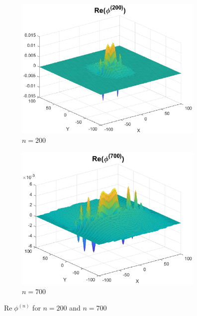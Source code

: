 \documentclass[smallextended]{svjour3}
\theoremstyle{remark}
\renewcommand\Re{\operatorname{Re}}%
\begin{document}
\begin{example}
\begin{figure}[!htb]
    \begin{subfigure}{0.49\textwidth}
    \centering
    \includegraphics[scale=0.4]{Fig10a.eps}
    \caption{$n = 200$}
    \label{fig:Conv_Pwr_5a}
    \end{subfigure}
    \begin{subfigure}{0.49\textwidth}
    \centering
    \includegraphics[scale=0.4]{Fig10b.eps}
    \caption{$n = 700$}
    \label{fig:Conv_Pwr_5b}
    \end{subfigure}
    \caption{$\Re{\phi^{(n)}}$ for $n = 200$ and $n=700$}
    \label{fig:Conv_Pwr_50}
\end{figure}
\end{example}
\end{document}
